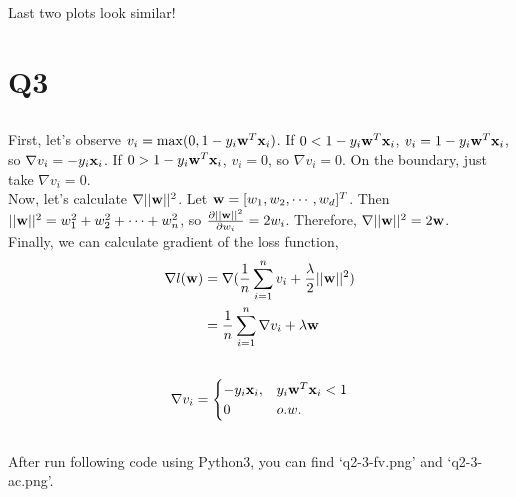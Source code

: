 \documentclass{article}
\begin{document}
Last two plots look similar!

\section{Q3}

\subsection{}
First, let's observe $v_i = \max(0,1-y_i\bold{w}^T\bold{x}_i)$.
If $0 < 1-y_i\bold{w}^T\bold{x}_i$,
$v_i = 1 - y_i\bold{w}^T\bold{x}_i$,
so $\nabla{v_i} = -y_i\bold{x}_i$.
If $0 > 1-y_i\bold{w}^T\bold{x}_i$,
$v_i = 0$, so $\nabla{v_i} = 0$.
On the boundary, just take $\nabla{v_i} = 0$. \\ 

Now, let's calculate $\nabla{||\bold{w}||^2}$.
Let $\bold{w}=[w_1,w_2,\cdots,w_d]^T$.
Then $||\bold{w}||^2 = w_1^2 + w_2^2 + \cdots + w_n^2$,
    so $\frac{\partial{||\bold{w}||^2}}{\partial{w_i}} = 2w_i$.
Therefore, $\nabla{||\bold{w}||^2} = 2\bold{w}$. \\

Finally, we can calculate gradient of the loss function,
\begin{align*}
    \nabla{l(\bold{w})}
    &= \nabla(\frac{1}{n}\sum\limits_{i=1}^n v_i + \frac{\lambda}{2}||\bold{w}||^2) \\
    &= \frac{1}{n}\sum\limits_{i=1}^n \nabla v_i + \lambda\bold{w} \\
    \\
\end{align*}
\begin{align*}
    \nabla v_i =
    \begin{cases}
        -y_i\bold{x}_i, & y_i\bold{w}^T\bold{x}_i < 1 \\
        0 & o.w.
    \end{cases}
\end{align*}

\subsection{}
After run following code using Python3, you can find `q2-3-fv.png' and `q2-3-ac.png'.

\end{document}
